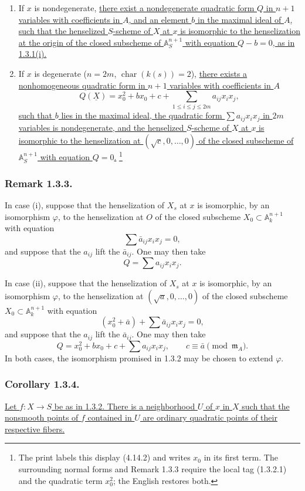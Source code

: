 \begin{enumerate}[label=(\roman*),leftmargin=2.6em]
\item If $x$ is nondegenerate, \underline{there exist a
nondegenerate quadratic form $Q$ in $n+1$ variables with
coefficients in $A$, and an element $b$ in the maximal ideal of $A$,
such that the henselized $S$-scheme of $X$ at $x$ is isomorphic to
the henselization at the origin of the closed subscheme of
$\mathbb A_S^{n+1}$ with equation $Q-b=0$, as in 1.3.1(i).}

\item If $x$ is degenerate
($n=2m$, $\operatorname{char}(k(s))=2$), \underline{there exists a
nonhomogeneous quadratic form in $n+1$ variables with coefficients
in $A$}
\begin{equation}\tag{1.3.2.1}
Q(\underline X)=x_0^2+b x_0+c+
 \sum_{1\leq i\leq j\leq 2m}a_{ij}x_i x_j,
\end{equation}
\underline{such that $b$ lies in the maximal ideal, the quadratic
form $\sum a_{ij}x_i x_j$ in $2m$ variables is nondegenerate, and
the henselized $S$-scheme of $X$ at $x$ is isomorphic to the
henselization at $(\sqrt c,0,\ldots,0)$ of the closed subscheme of
$\mathbb A_S^{n+1}$ with equation $Q=0$.}
\footnote{The print labels this display (4.14.2) and writes $x_0$ in
its first term.  The surrounding normal forms and Remark 1.3.3
require the local tag (1.3.2.1) and the quadratic term $x_0^2$; the
English restores both.}
\end{enumerate}

\subsubsection*{Remark 1.3.3.}
In case (i), suppose that the henselization of $X_s$ at $x$ is
isomorphic, by an isomorphism $\varphi$, to the henselization at $O$
of the closed subscheme
$X_0\subset\mathbb A_k^{n+1}$ with equation
\[
\sum\bar a_{ij}x_i x_j=0,
\]
and suppose that the $a_{ij}$ lift the $\bar a_{ij}$.  One may then
take
\[
Q=\sum a_{ij}x_i x_j.
\]

In case (ii), suppose that the henselization of $X_s$ at $x$ is
isomorphic, by an isomorphism $\varphi$, to the henselization at
$(\sqrt a,0,\ldots,0)$ of the closed subscheme
$X_0\subset\mathbb A_k^{n+1}$ with equation
\[
(x_0^2+\bar a)+\sum\bar a_{ij}x_i x_j=0,
\]
and suppose that the $a_{ij}$ lift the $\bar a_{ij}$.  One may then
take
\[
Q=x_0^2+b x_0+c+\sum a_{ij}x_i x_j,
\qquad c\equiv\bar a\pmod{\mathfrak m_A}.
\]
In both cases, the isomorphism promised in 1.3.2 may be chosen to
extend $\varphi$.

\subsubsection*{Corollary 1.3.4.}
\underline{Let $f:X\to S$ be as in 1.3.2.  There is a neighborhood
$U$ of $x$ in $X$ such that the nonsmooth points of $f$ contained in
$U$ are ordinary quadratic points of their respective fibers.}
